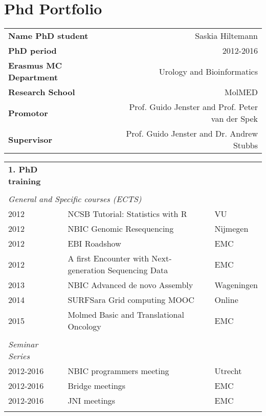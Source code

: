 \chapter{Phd Portfolio}
\label{AppendixE}

\tiny
\newpage
\begin{table}
    \begin{tabular}{lp{2cm}r}
        \textbf{Name PhD student}      && Saskia Hiltemann \\
        \textbf{PhD period}            && 2012-2016 \\
        \textbf{Erasmus MC Department} && Urology and Bioinformatics \\
        \textbf{Research School}       && MolMED \\
        \textbf{Promotor}              && Prof. Guido Jenster and Prof. Peter van der Spek \\
        \textbf{Supervisor}            && Prof. Guido Jenster and Dr. Andrew Stubbs \\
    \end{tabular}
\end{table}

\vspace{-5cm}
\small

\begin{table}
    \begin{tabular}{lll}
        \textbf{1. PhD training} \\
        \\
        \multicolumn{3}{l}{\textit{General  and Specific courses (ECTS)}} \\
        2012 & NCSB Tutorial: Statistics with R                       & VU \\
        2012 & NBIC Genomic Resequencing                              & Nijmegen \\
        2012 & EBI Roadshow                                           & EMC \\
        2012 & A first Encounter with Next-generation Sequencing Data & EMC \\
        2013 & NBIC Advanced de novo Assembly                         & Wageningen \\
        2014 & SURFSara Grid computing MOOC                           & Online \\
        2015 & Molmed Basic and Translational Oncology                & EMC \\
        \\
        \textit{Seminar Series} \\
        2012-2016 & NBIC programmers meeting       & Utrecht \\
        2012-2016 & Bridge meetings                & EMC \\
        2012-2016 & JNI meetings                   & EMC \\
        \\
    \end{tabular}
\end{table}

